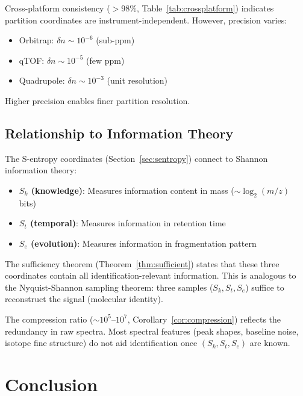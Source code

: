 Cross-platform consistency ($> 98\%$, Table~\ref{tab:crossplatform}) indicates partition coordinates are instrument-independent. However, precision varies:
\begin{itemize}
    \item Orbitrap: $\delta n \sim 10^{-6}$ (sub-ppm)
    \item qTOF: $\delta n \sim 10^{-5}$ (few ppm)
    \item Quadrupole: $\delta n \sim 10^{-3}$ (unit resolution)
\end{itemize}

Higher precision enables finer partition resolution.

\subsection{Relationship to Information Theory}

The S-entropy coordinates (Section~\ref{sec:sentropy}) connect to Shannon information theory:

\begin{itemize}
    \item \textbf{$S_k$ (knowledge)}: Measures information content in mass ($\sim \log_2(m/z)$ bits)
    \item \textbf{$S_t$ (temporal)}: Measures information in retention time
    \item \textbf{$S_e$ (evolution)}: Measures information in fragmentation pattern
\end{itemize}

The sufficiency theorem (Theorem~\ref{thm:sufficient}) states that these three coordinates contain all identification-relevant information. This is analogous to the Nyquist-Shannon sampling theorem: three samples ($S_k, S_t, S_e$) suffice to reconstruct the signal (molecular identity).

The compression ratio ($\sim 10^5$–$10^7$, Corollary~\ref{cor:compression}) reflects the redundancy in raw spectra. Most spectral features (peak shapes, baseline noise, isotope fine structure) do not aid identification once $(S_k, S_t, S_e)$ are known.

\section{Conclusion}

